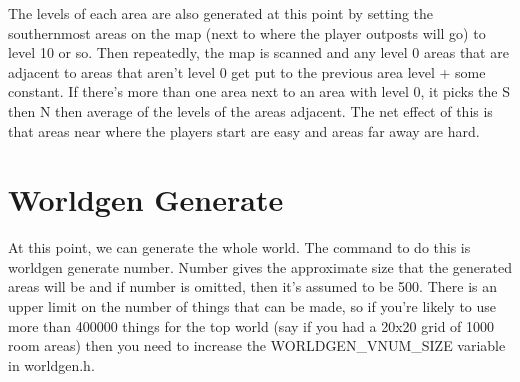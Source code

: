 The levels of each area are also generated at this point by setting
the southernmost areas on the map (next to where the player outposts
will go) to level 10 or so. Then repeatedly, the map is scanned and
any level 0 areas that are adjacent to areas that aren't level 0 get
put to the previous area level + some constant. If there's more than
one area next to an area with level 0, it picks the S then N then 
average of the levels of the areas adjacent. The net effect of this
is that areas near where the players start are easy and areas far away
are hard.

\section{Worldgen Generate}

At this point, we can generate the whole world. The command to do this is
worldgen generate number. Number gives the approximate size that
the generated areas will be and if number is omitted, then it's
assumed to be 500. There is an upper limit on the number of things
that can be made, so if you're likely to use more than 400000 things
for the top world (say if you had a 20x20 grid of 1000 room areas)
then you need to increase the WORLDGEN\_VNUM\_SIZE variable in
worldgen.h.



